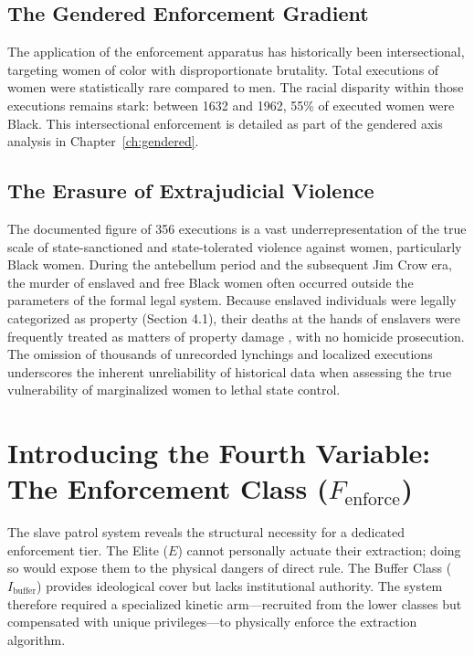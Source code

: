 \subsection{The Gendered Enforcement Gradient}

The application of the enforcement apparatus has historically been intersectional, targeting women of color with disproportionate brutality. Total executions of women were statistically rare compared to men. The racial disparity within those executions remains stark: between 1632 and 1962, 55\% of executed women were Black. This intersectional enforcement is detailed as part of the gendered axis analysis in Chapter~\ref{ch:gendered}.

\subsection{The Erasure of Extrajudicial Violence}

The documented figure of 356 executions is a vast underrepresentation of the true scale of state-sanctioned and state-tolerated violence against women, particularly Black women. During the antebellum period and the subsequent Jim Crow era, the murder of enslaved and free Black women often occurred outside the parameters of the formal legal system. Because enslaved individuals were legally categorized as property (Section 4.1), their deaths at the hands of enslavers were frequently treated as matters of property damage , with no homicide prosecution. The omission of thousands of unrecorded lynchings and localized executions underscores the inherent unreliability of historical data when assessing the true vulnerability of marginalized women to lethal state control.

\section{Introducing the Fourth Variable: The Enforcement Class ($F_{\text{enforce}}$)}

The slave patrol system reveals the structural necessity for a dedicated enforcement tier. The Elite ($E$) cannot personally actuate their extraction; doing so would expose them to the physical dangers of direct rule. The Buffer Class ($I_{\text{buffer}}$) provides ideological cover but lacks institutional authority. The system therefore required a specialized kinetic arm---recruited from the lower classes but compensated with unique privileges---to physically enforce the extraction algorithm.

